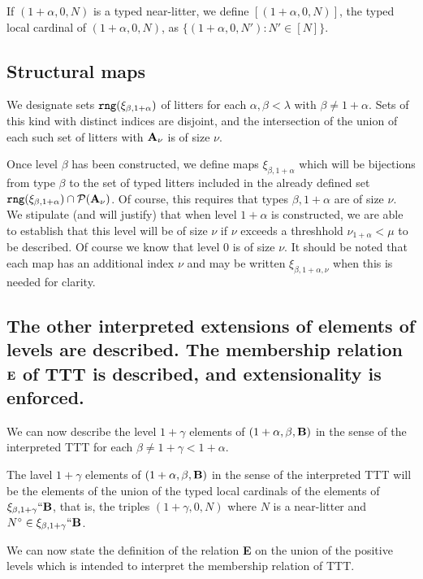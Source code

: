 \documentclass[12pt]{article}
\begin{document}
If $(1+\alpha,0,N)$ is a typed near-litter, we define $[(1+\alpha,0,N)]$, the typed local cardinal of $(1+\alpha,0,N)$, as $\{(1+\alpha,0,N'):N' \in [N]\}$.

\subsection{Structural maps}

We designate sets ${\tt rng}(\xi_{\beta,1+\alpha})$ of litters for each $\alpha, \beta <\lambda$ with $\beta \neq 1+\alpha$.  Sets of this kind with distinct indices are disjoint,
and the intersection of the union of each such set of litters with ${\bf A}_\nu$ is of size $\nu$.

Once level $\beta$ has been constructed, we define maps $\xi_{\beta,1+\alpha}$ which will be bijections from type $\beta$ to the set of typed litters included in the already defined set
${\tt rng}(\xi_{\beta,1+\alpha})\cap {\cal P}({\bf A}_\nu)$.  Of course, this requires that types $\beta,1+\alpha$ are of size $\nu$.  We stipulate (and will justify) that when
level $1+\alpha$ is constructed, we are able to establish that this level will be of size $\nu$ if $\nu$ exceeds a threshhold $\nu_{1+\alpha}<\mu$ to be described.  Of course we know that level 0 is of size $\nu$.  It should be noted that each map has an additional index $\nu$ and may be written $\xi_{\beta,1+\alpha,\nu}$ when this is needed for clarity.

\subsection{The other interpreted extensions of elements of levels are described.  The membership relation ${\bf E}$ of TTT is described, and extensionality is enforced.}

We can now describe the level $1+\gamma$ elements of $(1+\alpha,\beta,{\bf B})$ in the sense of the interpreted TTT for each $\beta \neq 1+\gamma <1+\alpha$.

The lavel $1+\gamma$ elements of $(1+\alpha,\beta,{\bf B})$ in the sense of the interpreted TTT will be the elements of the union of the typed local cardinals of the elements of $\xi_{\beta,1+\gamma}``{\bf B}$, that is, the triples $(1+\gamma,0,N)$ where $N$ is a near-litter and $N^\circ \in \xi_{\beta,1+\gamma}``{\bf B}$.

We can now state the definition of the relation {\bf E} on the union of the positive levels which is intended to interpret the membership relation of TTT.  
\end{document}

